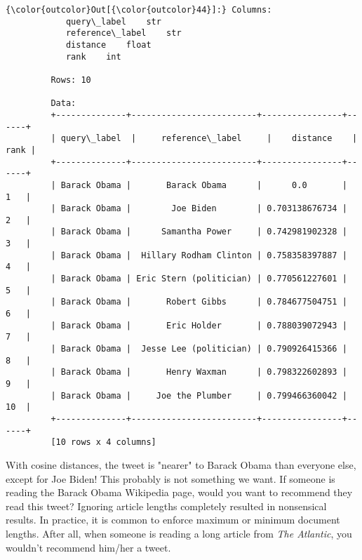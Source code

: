 \documentclass[11pt]{article}
\begin{document}
    
\begin{Verbatim}[commandchars=\\\{\}]
{\color{outcolor}Out[{\color{outcolor}44}]:} Columns:
         	query\_label	str
         	reference\_label	str
         	distance	float
         	rank	int
         
         Rows: 10
         
         Data:
         +--------------+-------------------------+----------------+------+
         | query\_label  |     reference\_label     |    distance    | rank |
         +--------------+-------------------------+----------------+------+
         | Barack Obama |       Barack Obama      |      0.0       |  1   |
         | Barack Obama |        Joe Biden        | 0.703138676734 |  2   |
         | Barack Obama |      Samantha Power     | 0.742981902328 |  3   |
         | Barack Obama |  Hillary Rodham Clinton | 0.758358397887 |  4   |
         | Barack Obama | Eric Stern (politician) | 0.770561227601 |  5   |
         | Barack Obama |       Robert Gibbs      | 0.784677504751 |  6   |
         | Barack Obama |       Eric Holder       | 0.788039072943 |  7   |
         | Barack Obama |  Jesse Lee (politician) | 0.790926415366 |  8   |
         | Barack Obama |       Henry Waxman      | 0.798322602893 |  9   |
         | Barack Obama |     Joe the Plumber     | 0.799466360042 |  10  |
         +--------------+-------------------------+----------------+------+
         [10 rows x 4 columns]
\end{Verbatim}
            
    With cosine distances, the tweet is "nearer" to Barack Obama than
everyone else, except for Joe Biden! This probably is not something we
want. If someone is reading the Barack Obama Wikipedia page, would you
want to recommend they read this tweet? Ignoring article lengths
completely resulted in nonsensical results. In practice, it is common to
enforce maximum or minimum document lengths. After all, when someone is
reading a long article from \emph{The Atlantic}, you wouldn't recommend
him/her a tweet.


    
    
    
    
\end{document}
